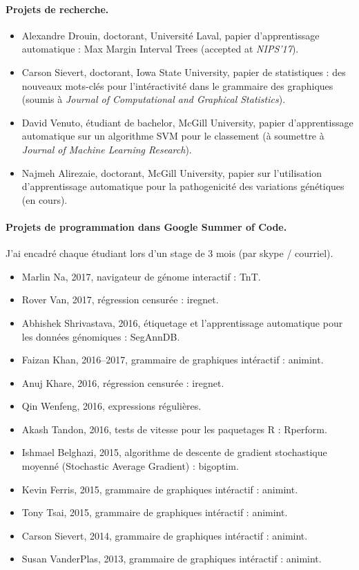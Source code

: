 \documentclass{article}
\begin{document}
\paragraph{Projets de recherche.}
\begin{itemize}
\item Alexandre Drouin, doctorant, Universit\'e Laval, papier
  d'apprentissage automatique : Max Margin Interval Trees (accepted at
  \emph{NIPS'17}).
\item Carson Sievert, doctorant, Iowa State University, papier de
  statistiques : des nouveaux mots-clés pour l'intéractivité dans le
  grammaire des graphiques (soumis à \emph{Journal of Computational
    and Graphical Statistics}).
\item David Venuto, étudiant de bachelor, McGill University, papier
  d'apprentissage automatique sur un algorithme SVM pour le classement
  (à soumettre à \emph{Journal of Machine Learning Research}).
\item Najmeh Alirezaie, doctorant, McGill University, papier sur
  l'utilisation d'apprentissage automatique pour la pathogenicité des
  variations génétiques (en cours).
\end{itemize}

\paragraph{Projets de programmation dans Google Summer of Code.} J'ai
encadré chaque étudiant lors d'un stage de 3 mois (par skype / courriel).
\begin{itemize}
\item Marlin Na, 2017, navigateur de génome interactif : TnT.
\item Rover Van, 2017, régression censurée : iregnet.
\item Abhishek Shrivastava, 2016, étiquetage et l'apprentissage automatique pour les données génomiques : SegAnnDB.
\item Faizan Khan, 2016--2017, grammaire de graphiques intéractif : animint.
\item Anuj Khare, 2016, régression censurée : iregnet.
\item Qin Wenfeng, 2016, expressions régulières.
\item Akash Tandon, 2016, tests de vitesse pour les paquetages R : Rperform.
\item Ishmael Belghazi, 2015, algorithme de descente de gradient
  stochastique moyenné (Stochastic Average Gradient) : bigoptim.
\item Kevin Ferris, 2015, grammaire de graphiques intéractif : animint.
\item Tony Tsai, 2015, grammaire de graphiques intéractif : animint.
\item Carson Sievert, 2014, grammaire de graphiques intéractif : animint.
\item Susan VanderPlas, 2013, grammaire de graphiques intéractif : animint.
\end{itemize}
\end{document}
